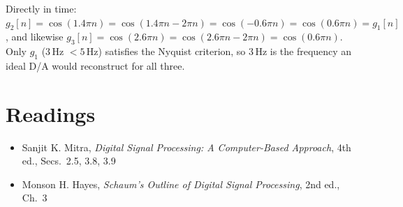 \documentclass[handout_subfiles_root.tex]{subfiles}
\begin{document}
\begin{notebox}[title=\HandoutNoteAddendumTitle]
Directly in time: $g_2[n] = \cos(1.4\pi n) = \cos(1.4\pi n - 2\pi n) = \cos(-0.6\pi n) = \cos(0.6\pi n) = g_1[n]$, and likewise $g_3[n] = \cos(2.6\pi n) = \cos(2.6\pi n - 2\pi n) = \cos(0.6\pi n)$. Only $g_1$ ($3$\,Hz $<5$\,Hz) satisfies the Nyquist criterion, so $3$\,Hz is the frequency an ideal D/A would reconstruct for all three.
\end{notebox}

\section*{Readings}
\begin{itemize}
  \item Sanjit K. Mitra, \textit{Digital Signal Processing: A Computer-Based Approach}, 4th ed., Secs.\ 2.5, 3.8, 3.9
  \item Monson H. Hayes, \textit{Schaum's Outline of Digital Signal Processing}, 2nd ed., Ch.\ 3
\end{itemize}

\HandoutAppendixListStart
\HandoutAppendixListEnd

\end{document}
